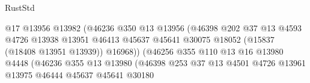 \begin{lexlean}{RustStd}
\begin{coremodule}
{\begin{coremodule}
{{{{{{{{{{{{{{{{{{{{{{{{{{{{{{{{{{{{{{{{{{{{{{{{{{{{{{{{{{{{                                                @17
                                                @13956
                                                @13982
                                                (@46236
                                                  @350
                                                  @13
                                                  @13956
                                                  (@46398
                                                    @202
                                                    @37
                                                    @13
                                                    @4593
                                                    @4726
                                                    @13938
                                                    @13951
                                                    @46413
                                                    @45637
                                                    @45641
                                                    @30075
                                                    @18052
                                                    (@15837 (@18408 @13951 @13939))
                                                    @16968))
                                                (@46256
                                                  @355
                                                  @110
                                                  @13
                                                  @16
                                                  @13980
                                                  @4448
                                                  (@46236
                                                    @355
                                                    @13
                                                    @13980
                                                    (@46398
                                                      @253
                                                      @37
                                                      @13
                                                      @4501
                                                      @4726
                                                      @13961
                                                      @13975
                                                      @46444
                                                      @45637
                                                      @45641
                                                      @30180
}}}}}}}}}}}}}}}}}}}}}}}}}}}}}}}}}}}}}}}}}}}}}}}}}}}}}}}}}}}}
\end{coremodule}}
\end{coremodule}
\end{lexlean}
